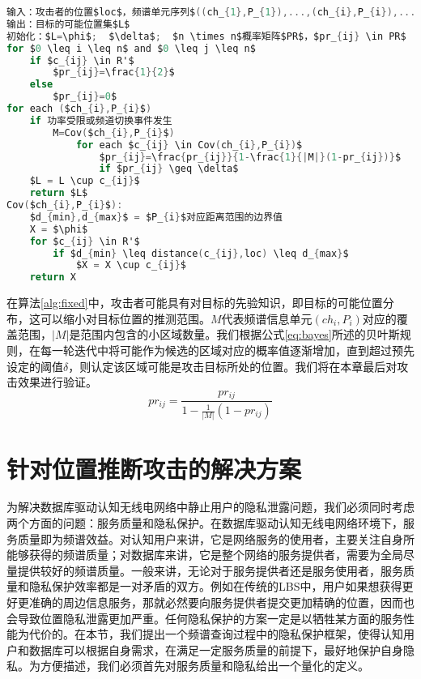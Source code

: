 \begin{lstlisting}[language={C}, caption={统一的位置推断攻击算法}]
输入：攻击者的位置$loc$，频谱单元序列$((ch_{1},P_{1}),...,(ch_{i},P_{i}),...,(ch_{C},P_{C})$；攻击者先验知识$R'$。
输出：目标的可能位置集$L$
初始化：$L=\phi$;  $\delta$;  $n \times n$概率矩阵$PR$，$pr_{ij} \in PR$
for $0 \leq i \leq n$ and $0 \leq j \leq n$
    if $c_{ij} \in R'$
        $pr_{ij}=\frac{1}{2}$
    else
        $pr_{ij}=0$
for each ($ch_{i},P_{i}$)
    if 功率受限或频道切换事件发生
        M=Cov($ch_{i},P_{i}$) 
            for each $c_{ij} \in Cov(ch_{i},P_{i})$
                $pr_{ij}=\frac{pr_{ij}}{1-\frac{1}{|M|}(1-pr_{ij})}$ 
                if $pr_{ij} \geq \delta$
    $L = L \cup c_{ij}$
    return $L$
Cov($ch_{i},P_{i}$):
    $d_{min},d_{max}$ = $P_{i}$对应距离范围的边界值
    X = $\phi$
    for $c_{ij} \in R'$
        if $d_{min} \leq distance(c_{ij},loc) \leq d_{max}$
            $X = X \cup c_{ij}$
    return X
\end{lstlisting}\label{alg:fixed}

在算法\ref{alg:fixed}中，攻击者可能具有对目标的先验知识，即目标的可能位置分布，这可以缩小对目标位置的推测范围。$M$代表频谱信息单元$(ch_{i},P_{i})$对应的覆盖范围，$|M|$是范围内包含的小区域数量。我们根据公式\ref{eq:bayes}所述的贝叶斯规则\cite{bahrak2013ex}，在每一轮迭代中将可能作为候选的区域对应的概率值逐渐增加，直到超过预先设定的阈值$\delta$，则认定该区域可能是攻击目标所处的位置。我们将在本章最后对攻击效果进行验证。
\begin{equation}\label{eq:bayes}
pr_{ij}=\frac{pr_{ij}}{1-\frac{1}{|M|}(1-pr_{ij})}
\end{equation}

\section{针对位置推断攻击的解决方案}

为解决数据库驱动认知无线电网络中静止用户的隐私泄露问题，我们必须同时考虑两个方面的问题：服务质量和隐私保护。在数据库驱动认知无线电网络环境下，服务质量即为频谱效益。对认知用户来讲，它是网络服务的使用者，主要关注自身所能够获得的频谱质量；对数据库来讲，它是整个网络的服务提供者，需要为全局尽量提供较好的频谱质量。一般来讲，无论对于服务提供者还是服务使用者，服务质量和隐私保护效率都是一对矛盾的双方。例如在传统的LBS中，用户如果想获得更好更准确的周边信息服务，那就必然要向服务提供者提交更加精确的位置，因而也会导致位置隐私泄露更加严重。任何隐私保护的方案一定是以牺牲某方面的服务性能为代价的。在本节，我们提出一个频谱查询过程中的隐私保护框架，使得认知用户和数据库可以根据自身需求，在满足一定服务质量的前提下，最好地保护自身隐私。为方便描述，我们必须首先对服务质量和隐私给出一个量化的定义。

